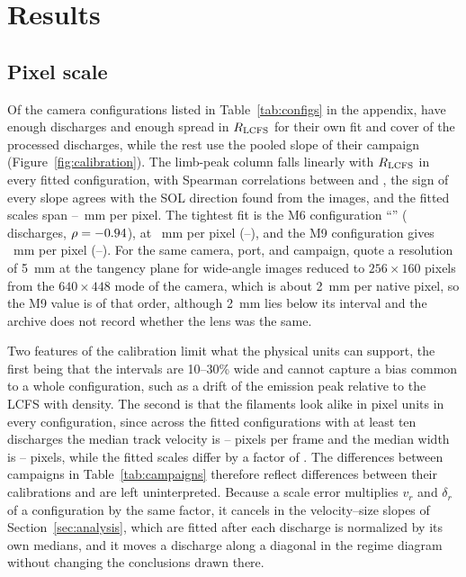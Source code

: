 \section{Results}
\label{sec:results}


\subsection{Pixel scale}
Of the \nConfigs{} camera configurations listed in Table~\ref{tab:configs} in the appendix, \nConfigsOwn{} have enough discharges and enough spread in $R_{\rm LCFS}$ for their own fit and cover \nShotsOwnScale{} of the \nShotsProcessed{} processed discharges, while the rest use the pooled slope of their campaign (Figure~\ref{fig:calibration}). The limb-peak column falls linearly with $R_{\rm LCFS}$ in every fitted configuration, with Spearman correlations between \scaleOwnRhoWeak{} and \scaleOwnRhoStrong{}, the sign of every slope agrees with the SOL direction found from the images, and the fitted scales span \scaleOwnMin{}--\scaleOwnMax{}~mm per pixel. The tightest fit is the M6 configuration ``\scaleCfgCampSixView'' (\scaleCfgCampSixN{} discharges, $\rho = -0.94$), at \scaleCfgCampSix{}~mm per pixel (\scaleCfgCampSixLo--\scaleCfgCampSixHi), and the M9 configuration gives \scaleCfgCampNine{}~mm per pixel (\scaleCfgCampNineLo--\scaleCfgCampNineHi). For the same camera, port, and campaign, \citet{farley2019identification} quote a resolution of 5~mm at the tangency plane for wide-angle images reduced to $256 \times 160$ pixels from the $640 \times 448$ mode of the camera, which is about 2~mm per native pixel, so the M9 value is of that order, although 2~mm lies below its interval and the archive does not record whether the lens was the same.

Two features of the calibration limit what the physical units can support, the first being that the intervals are 10--30\% wide and cannot capture a bias common to a whole configuration, such as a drift of the emission peak relative to the LCFS with density. The second is that the filaments look alike in pixel units in every configuration, since across the \nCfgPx{} fitted configurations with at least ten discharges the median track velocity is \vxPxCfgMin{}--\vxPxCfgMax{} pixels per frame and the median width is \fwhmPxCfgMin{}--\fwhmPxCfgMax{} pixels, while the fitted scales differ by a factor of \scaleOwnRatio. The differences between campaigns in Table~\ref{tab:campaigns} therefore reflect differences between their calibrations and are left uninterpreted. Because a scale error multiplies $v_r$ and $\delta_r$ of a configuration by the same factor, it cancels in the velocity--size slopes of Section~\ref{sec:analysis}, which are fitted after each discharge is normalized by its own medians, and it moves a discharge along a diagonal in the regime diagram without changing the conclusions drawn there.

